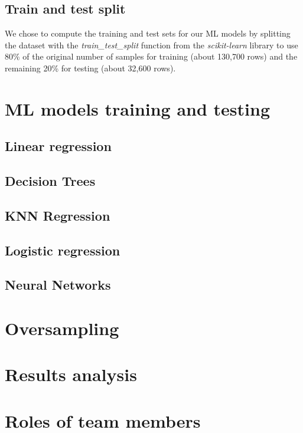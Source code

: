 \documentclass{article}
\begin{document}
\subsection{Train and test split}

We chose to compute the training and test sets for our ML models by splitting the dataset with the \textit{train\_test\_split} function from the \textit{scikit-learn} library to use 80\% of the original number of samples for training (about 130,700 rows) and the remaining 20\% for testing (about 32,600 rows).

\section{ML models training and testing}
\subsection{Linear regression}
\subsection{Decision Trees}
\subsection{KNN Regression}
\subsection{Logistic regression}
\subsection{Neural Networks}
\section{Oversampling}
\label{sec:oversamp}
\section{Results analysis}
\section{Roles of team members}



\end{document}
